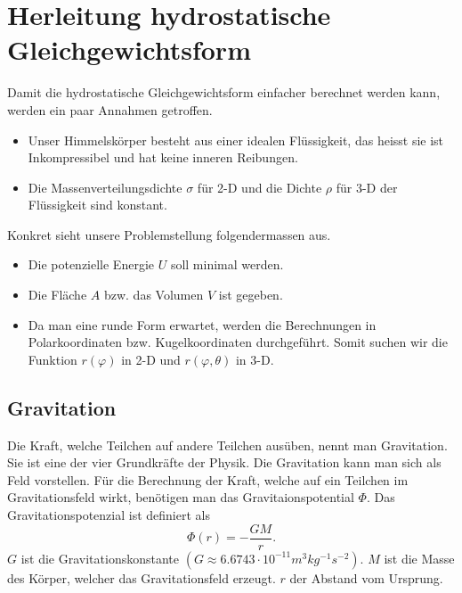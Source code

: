 %
%
%
%
\section{Herleitung hydrostatische Gleichgewichtsform
\label{planet:section:teil1}}
Damit die hydrostatische Gleichgewichtsform einfacher berechnet werden kann, werden ein paar Annahmen getroffen.
\begin{itemize}
	\item Unser Himmelskörper besteht aus einer idealen Flüssigkeit, das heisst sie ist Inkompressibel und hat keine inneren Reibungen.
	\item Die Massenverteilungsdichte \(\sigma\) für 2-D und die Dichte \(\rho\) für 3-D der Flüssigkeit sind konstant.	
\end{itemize}

Konkret sieht unsere Problemstellung folgendermassen aus.
\begin{itemize}
	\item Die potenzielle Energie \(U\) soll minimal werden.
	\item Die Fläche \(A\) bzw. das Volumen \(V\) ist gegeben.
	\item Da man eine runde Form erwartet, werden die Berechnungen in Polarkoordinaten bzw. Kugelkoordinaten durchgeführt. Somit suchen wir die Funktion \(r(\varphi)\) in 2-D und \(r(\varphi,\theta)\) in 3-D.
\end{itemize}

\subsection{Gravitation}

Die Kraft, welche Teilchen auf andere Teilchen ausüben, nennt man Gravitation.
Sie ist eine der vier Grundkräfte der Physik.
Die Gravitation kann man sich als Feld vorstellen.
Für die Berechnung der Kraft, welche auf ein Teilchen im Gravitationsfeld wirkt, benötigen man das Gravitaionspotential \(\Phi\).
Das Gravitationspotenzial ist definiert als
\begin{equation}
	\Phi(r) = -\frac{GM}{r}.
	\label{planet:equ:gravpot}
\end{equation}
\(G\) ist die Gravitationskonstante \((G \approx 6.6743 \cdot 10^{-11} m^3 kg^{-1} s^{-2})\).
\(M\) ist die Masse des Körper, welcher das Gravitationsfeld erzeugt.
\(r\) der Abstand vom Ursprung.

